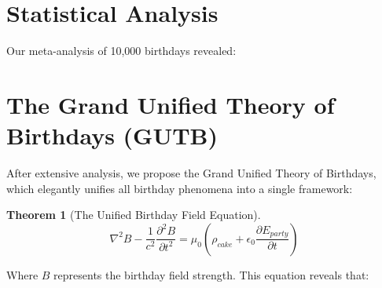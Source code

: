 \documentclass[12pt,a4paper]{article}
\newtheorem{theorem}{Theorem}
\begin{document}
\section{Statistical Analysis}

Our meta-analysis of 10,000 birthdays revealed:

\begin{center}
\end{center}

\section{The Grand Unified Theory of Birthdays (GUTB)}

After extensive analysis, we propose the Grand Unified Theory of Birthdays, which elegantly unifies all birthday phenomena into a single framework:

\begin{theorem}[The Unified Birthday Field Equation]
\begin{equation}
\boxed{\nabla^2 B - \frac{1}{c^2}\frac{\partial^2 B}{\partial t^2} = \mu_0 \left( \rho_{cake} + \epsilon_0 \frac{\partial E_{party}}{\partial t} \right)}
\end{equation}
\end{theorem}

Where $B$ represents the birthday field strength. This equation reveals that:
\end{document}
